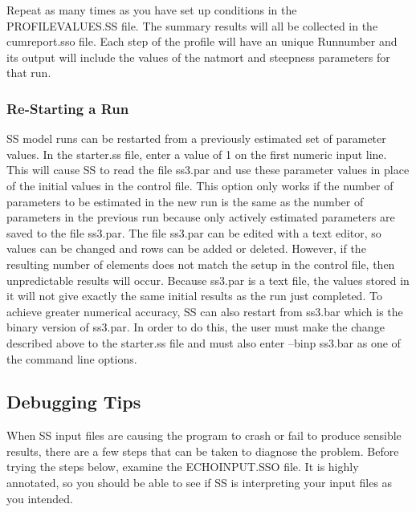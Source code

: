 Repeat as many times as you have set up conditions in the PROFILEVALUES.SS file.
The summary results will all be collected in the cumreport.sso file.  Each step of the profile will have an unique Runnumber and its output will include the values of the natmort and steepness parameters for that run.

\subsubsection{Re-Starting a Run}
SS model runs can be restarted from a previously estimated set of parameter values.  In the starter.ss file, enter a value of 1 on the first numeric input line.  This will cause SS to read the file ss3.par and use these parameter values in place of the initial values in the control file.  This option only works if the number of parameters to be estimated in the new run is the same as the number of parameters in the previous run because only actively estimated parameters are saved to the file ss3.par.  The file ss3.par can be edited with a text editor, so values can be changed and rows can be added or deleted.  However, if the resulting number of elements does not match the setup in the control file, then unpredictable results will occur.  Because ss3.par is a text file, the values stored in it will not give exactly the same initial results as the run just completed.  To achieve greater numerical accuracy, SS can also restart from ss3.bar which is the binary version of ss3.par.  In order to do this, the user must make the change described above to the starter.ss file and must also enter –binp ss3.bar as one of the command line options.

\subsection{Debugging Tips}
When SS input files are causing the program to crash or fail to produce sensible results, there are a few steps that can be taken to diagnose the problem.  Before trying the steps below, examine the ECHOINPUT.SSO file.  It is highly annotated, so you should be able to see if SS is interpreting your input files as you intended.

